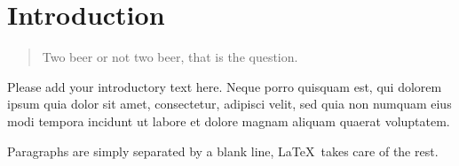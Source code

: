 \chapter{Introduction}
\label{ch: Introduction}

\begin{quotation}
    Two beer or not two beer, that is the question.
\end{quotation}

Please add your introductory text here. Neque porro quisquam est, qui dolorem ipsum quia dolor sit amet, consectetur, adipisci velit, sed quia non numquam eius modi tempora incidunt ut labore et dolore magnam aliquam quaerat voluptatem.

Paragraphs are simply separated by a blank line, \LaTeX\  takes care of the rest.
